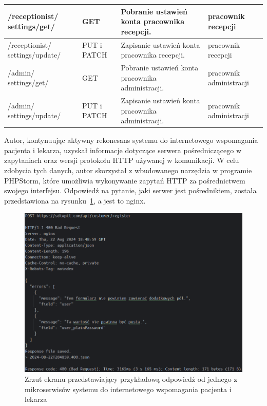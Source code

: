 \documentclass[12pt,oneside]{book}
\newcommand{\captionvspace}{\vspace{6pt}}
\begin{document}
\begin{longtable}{|>{\raggedright\arraybackslash}p{3cm}|>{\raggedright\arraybackslash}p{2cm}|>{\raggedright\arraybackslash}p{5cm}|>{\raggedright\arraybackslash}p{3.5cm}|}
        /receptionist/ settings/get/    & GET                            & Pobranie ustawień konta pracownika recepcji.                                   & pracownik recepcji                                           \\ \hline
        /receptionist/ settings/update/ & PUT i PATCH                    & Zapisanie ustawień konta pracownika recepcji. & pracownik recepcji \\ \hline
        /admin/ settings/get/           & GET                            & Pobranie ustawień konta pracownika administracji.                              & pracownik administracji                                      \\ \hline
        /admin/ settings/update/        & PUT i PATCH                    & Zapisanie ustawień konta pracownika administracji. & pracownik administracji \\ \hline

    \end{longtable}

    Autor, kontynuując aktywny rekonesans systemu do internetowego wspomagania pacjenta i lekarza, uzyskał informacje dotyczące serwera pośredniczącego w zapytaniach oraz wersji protokołu HTTP używanej w komunikacji. W celu zdobycia tych danych, autor skorzystał z wbudowanego narzędzia w programie PHPStorm, które umożliwia wykonywanie zapytań HTTP za pośrednictwem swojego interfejsu. Odpowiedź na pytanie, jaki serwer jest pośrednikiem, została przedstawiona na rysunku~\ref{fig:sdiwpil-response}, a jest to nginx.

    \begin{figure}[ht]
        \centering
        \includegraphics[width=\textwidth]{includes/images/example-response-from-sdiwpil.png}
        \captionvspace
        \caption{Zrzut ekranu przedstawiający przykładową odpowiedź od jednego z mikroserwisów systemu do internetowego wspomagania pacjenta i lekarza}
        \label{fig:sdiwpil-response}
    \end{figure}
\end{document}
